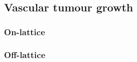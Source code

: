 \documentclass[superscriptaddress, a4paper]{article}
\begin{document}
\subsection{Vascular tumour growth}
\label{sec:vascular tumour growth}

\subsubsection{On-lattice}
\label{sec:on-lattice vascular tumour growth}



\subsubsection{Off-lattice}
\label{sec:off-lattice vascular tumour growth}
\end{document}
